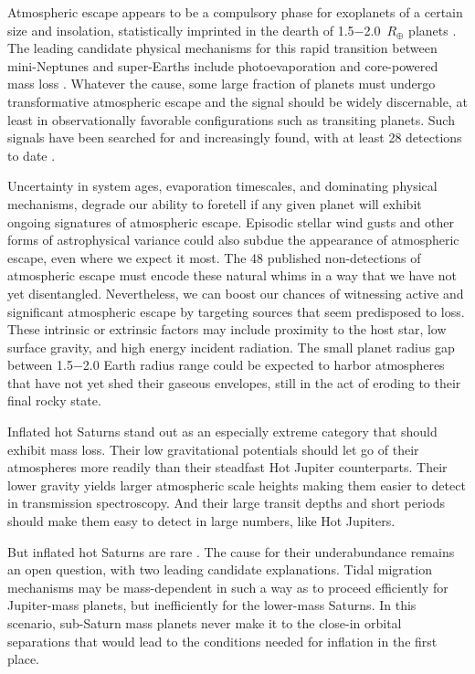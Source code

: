 \documentclass[twocolumn]{aastex631}
\begin{document}
Atmospheric escape appears to be a compulsory phase for exoplanets of a certain size and insolation, statistically imprinted in the dearth of 1.5$-$2.0~$R_\oplus$ planets \citep{2017AJ....154..109F}.  The leading candidate physical mechanisms for this rapid transition between mini-Neptunes and super-Earths include photoevaporation \citep{2013ApJ...775..105O,2017ApJ...847...29O} and core-powered mass loss \citep{2019MNRAS.487...24G}.  Whatever the cause, some large fraction of planets must undergo transformative atmospheric escape and the signal should be widely discernable, at least in observationally favorable configurations such as transiting planets.  Such signals have been searched for and increasingly found, with at least 28 detections to date \citep{2022arXiv221116243D}.

Uncertainty in system ages, evaporation timescales, and dominating physical mechanisms, degrade our ability to foretell if any given planet will exhibit ongoing signatures of atmospheric escape.  Episodic stellar wind gusts and other forms of astrophysical variance could also subdue the appearance of atmospheric escape, even where we expect it most.  The 48 published non-detections of atmospheric escape \citep{2022arXiv221116243D} must encode these natural whims in a way that we have not yet disentangled. Nevertheless, we can boost our chances of witnessing active and significant atmospheric escape by targeting sources that seem predisposed to loss.  These intrinsic or extrinsic factors may include proximity to the host star, low surface gravity, and high energy incident radiation.  The small planet radius gap between 1.5$-$2.0 Earth radius range could be expected to harbor atmospheres that have not yet shed their gaseous envelopes, still in the act of eroding to their final rocky state.

Inflated hot Saturns stand out as an especially extreme category that should exhibit mass loss.  Their low gravitational potentials should let go of their atmospheres more readily than their steadfast Hot Jupiter counterparts.  Their lower gravity yields larger atmospheric scale heights making them easier to detect in transmission spectroscopy.  And their large transit depths and short periods should make them easy to detect in large numbers, like Hot Jupiters.

But inflated hot Saturns are rare \citep{2018AJ....155..214T}.  The cause for their underabundance remains an open question, with two leading candidate explanations.  Tidal migration mechanisms may be mass-dependent in such a way as to proceed efficiently for Jupiter-mass planets, but inefficiently for the lower-mass Saturns.  In this scenario, sub-Saturn mass planets never make it to the close-in orbital separations that would lead to the conditions needed for inflation in the first place.
\end{document}
